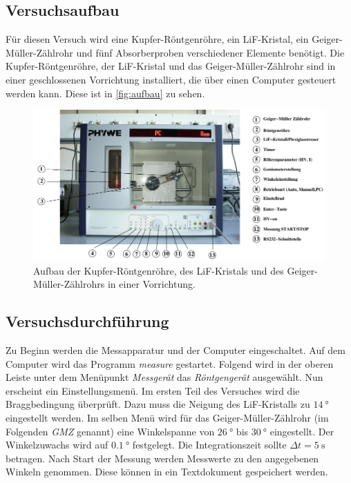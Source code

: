 \subsection{Versuchsaufbau}
\label{subsec:Versuchsaufbau}
Für diesen Versuch wird eine Kupfer-Röntgenröhre, ein LiF-Kristal, ein Geiger-Müller-Zählrohr und fünf Absorberproben verschiedener Elemente benötigt. 
Die Kupfer-Röntgenröhre, der LiF-Kristal und das Geiger-Müller-Zählrohr sind in einer geschlossenen Vorrichtung installiert, die über einen Computer gesteuert
werden kann. Diese ist in \autoref{fig:aufbau} zu sehen.

\begin{figure}
    \centering
    \includegraphics[width = \textwidth]{content/aufbauskizze.PNG}
    \caption{Aufbau der Kupfer-Röntgenröhre, des LiF-Kristals und des Geiger-Müller-Zählrohrs in einer Vorrichtung. \cite{v602}}
    \label{fig:aufbau}
\end{figure}

\subsection{Versuchsdurchführung}
\label{subsec:versuchsdurchführung}
Zu Beginn werden die Messapparatur und der Computer eingeschaltet. Auf dem Computer wird das Programm \textit{measure} gestartet.
Folgend wird in der oberen Leiste unter dem Menüpunkt \textit{Messgerät} das \textit{Röntgengerät} ausgewählt. Nun erscheint ein Einstellungsmenü.
Im ersten Teil des Versuches wird die Braggbedingung überprüft. Dazu muss die Neigung des LiF-Kristalls zu $\qty{14}{\degree}$ eingestellt werden. 
Im selben 
Menü wird für das Geiger-Müller-Zählrohr (im Folgenden \textit{GMZ} genannt) eine Winkelspanne von $\qty{26}{\degree}$ bis $\qty{30}{\degree}$ eingestellt. Der Winkelzuwachs
wird auf $\qty{0.1}{\degree}$ festgelegt. Die Integrationszeit sollte $\Delta t = \qty{5}{\second}$ betragen.
Nach Start der Messung werden Messwerte zu den angegebenen Winkeln genommen. Diese können in ein Textdokument gespeichert werden.

